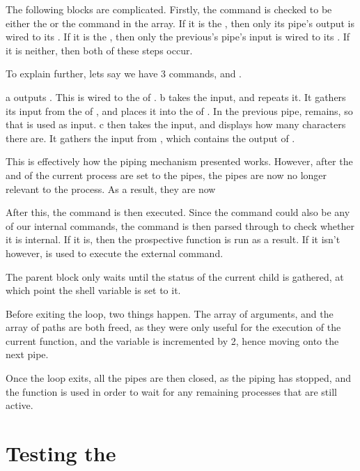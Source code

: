 \documentclass[12pt, a4paper]{report}
\begin{document}
                \clearpage


                \begingroup
                \fontsize{10pt}{10pt}\selectfont
                \endgroup

                The following blocks are complicated. Firstly, the command is checked
                to be either the  or the  command in the array.
                If it is the , then only its pipe's output is wired to its .
                If it is the , then only the previous's pipe's input is wired to its .
                If it is neither, then both of these steps occur.

                To explain further, lets say we have 3 commands,  and .

                a outputs . This is wired to the  of .
                b takes the input, and repeats it. It gathers its input from the  of ,
                and places it into the  of . In the previous pipe, 
                remains, so that is used as input. c then takes the input, and displays how many characters there
                are. It gathers the input from , which contains the output of .

                This is effectively how the piping mechanism presented works. However, after the
                 and  of the current process are set to the pipes, the pipes are
                now no longer relevant to the process. As a result, they are now 
                \clearpage

                After this, the command is then executed. Since the command could also be any
                of our internal commands, the command is then parsed through to check whether
                it is internal. If it is, then the prospective function is run as a result.
                If it isn't however,  is used to execute the external command.
                
                The parent block only waits until the status of the current child is gathered,
                at which point the  shell variable is set to it.

                Before exiting the loop, two things happen. The array of arguments, and the array
                of paths are both freed, as they were only useful for the execution of the current
                function, and the  variable is incremented by 2, hence moving onto the next pipe.

                Once the loop exits, all the pipes are then closed, as the piping has stopped, and
                the  function is used in order to wait for any remaining processes that are
                still active.

    \chapter{Testing the }
\end{document}
